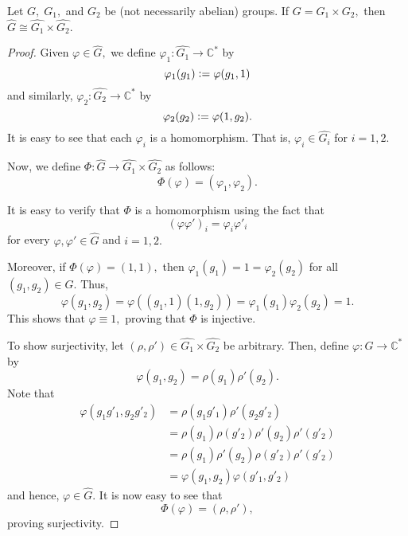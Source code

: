 \begin{prop}
	Let $G,\;G_1,$ and $G_2$ be (not necessarily abelian) groups. If $G = G_1 \times G_2,$ then $\widehat{G} \cong \widehat{G_1} \times \widehat{G_2}.$ 
\end{prop}
\begin{proof} 
	Given $\varphi \in \widehat{G},$ we define $\varphi_1 : \widehat{G_1} \to \mathbb{C}^*$ by
	\begin{equation*} 
		\varphi_1(g_1) \vcentcolon= \varphi(g_1, 1)
	\end{equation*}
	and similarly, $\varphi_2 : \widehat{G_2} \to \mathbb{C}^*$ by
	\begin{equation*} 
		\varphi_2(g_2) \vcentcolon= \varphi(1, g_2).
	\end{equation*}
	It is easy to see that each $\varphi_i$ is a homomorphism. That is, $\varphi_i \in \widehat{G_i}$ for $i = 1, 2.$ 

	Now, we define $\Phi:\widehat{G} \to \widehat{G_1} \times \widehat{G_2}$ as follows:	
	\begin{equation*} 
		\Phi(\varphi) = (\varphi_1, \varphi_2).
	\end{equation*}

	It is easy to verify that $\Phi$ is a homomorphism using the fact that
	\begin{equation*} 
		(\varphi\varphi')_i = \varphi_i\varphi'_i
	\end{equation*}
	for every $\varphi, \varphi' \in \widehat{G}$ and $i = 1, 2.$

	Moreover, if $\Phi(\varphi) = (1, 1),$ then $\varphi_1(g_1) = 1 = \varphi_2(g_2)$ for all $(g_1, g_2) \in G.$ Thus,
	\begin{equation*} 
		\varphi(g_{1}, g_{2}) = \varphi\left((g_{1}, 1) (1, g_{2})\right) = \varphi_1(g_1) \varphi_2(g_2) = 1.
	\end{equation*}
	This shows that $\varphi \equiv 1,$ proving that $\Phi$ is injective.

	To show surjectivity, let $(\rho, \rho') \in \widehat{G_1} \times \widehat{G_2}$ be arbitrary. Then, define $\varphi:G \to \mathbb{C}^*$ by
	\begin{equation*} 
		\varphi(g_1, g_2) = \rho(g_1)\rho'(g_2).
	\end{equation*}
	Note that
	\begin{align*} 
		\varphi(g_1g'_1, g_2g'_2) &= \rho(g_1g'_1)\rho'(g_2g'_2)\\
		&= \rho(g_1)\rho(g'_2)\rho'(g_2)\rho'(g'_2)\\
		&= \rho(g_1)\rho'(g_2)\rho(g'_2)\rho'(g'_2)\\
		&= \varphi(g_1, g_2)\varphi(g'_1, g'_2)
	\end{align*}
	and hence, $\varphi \in \widehat{G}.$ It is now easy to see that
	\begin{equation*} 
		\Phi(\varphi) = (\rho, \rho'),
	\end{equation*}
	proving surjectivity.	
\end{proof}

